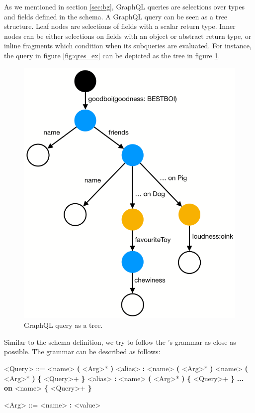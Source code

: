 As we mentioned in section \ref{sec:bg}, GraphQL queries are selections over types and fields defined in the schema. A GraphQL query can be seen as a tree structure. Leaf nodes are selections of fields with a scalar return type. Inner nodes can be either selections on fields with an object or abstract return type, or inline fragments which condition when its subqueries are evaluated. For instance, the query in figure \ref{fig:qres_ex} can be depicted as the tree in figure \ref{fig:query_tree}.

\begin{figure}
    \centering
    \includegraphics[scale=0.33]{imgs/query_tree.png}
    \caption{GraphQL query as a tree.}
    \label{fig:query_tree}
\end{figure}

Similar to the schema definition, we try to follow the \spec{}'s grammar as close as possible. The grammar can be described as follows:
\begin{grammar}
    <Query> ::= <name> \textbf{(} <Arg>* \textbf{)}
    \alt <alias> \textbf{:} <name> \textbf{(} <Arg>* \textbf{)}
    \alt <name> \textbf{(} <Arg>* \textbf{)} \textbf{\{} <Query>+ \textbf{\}}
    \alt <alias> \textbf{:} <name> \textbf{(} <Arg>* \textbf{)} \textbf{\{} <Query>+ \textbf{\}}
    \alt \textbf{... on} <name> \textbf{\{} <Query>+ \textbf{\}}

    <Arg> ::= <name> \textbf{:} <value>
\end{grammar}

